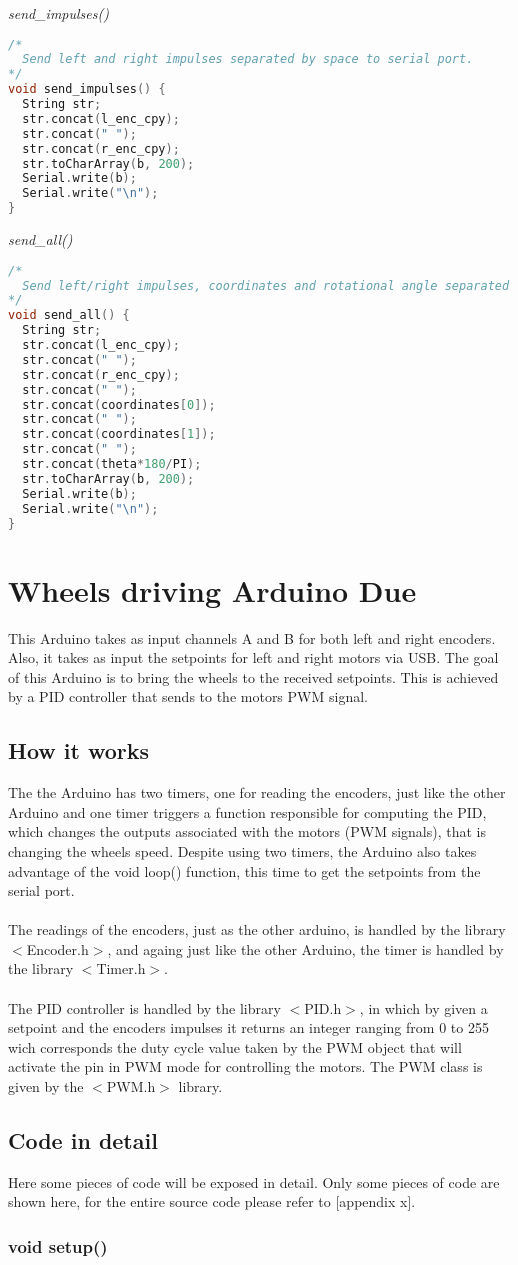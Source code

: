 \textit{send\_impulses()}

\begin{lstlisting}[language=C]
/* 
  Send left and right impulses separated by space to serial port. 
*/
void send_impulses() {
  String str;
  str.concat(l_enc_cpy);
  str.concat(" ");
  str.concat(r_enc_cpy);
  str.toCharArray(b, 200);
  Serial.write(b);
  Serial.write("\n");
}
\end{lstlisting}

\textit{send\_all()}

\begin{lstlisting}[language=C]
/* 
  Send left/right impulses, coordinates and rotational angle separated by space to serial port. 
*/
void send_all() {
  String str;
  str.concat(l_enc_cpy);
  str.concat(" ");
  str.concat(r_enc_cpy);
  str.concat(" ");
  str.concat(coordinates[0]);
  str.concat(" ");
  str.concat(coordinates[1]);
  str.concat(" ");
  str.concat(theta*180/PI);
  str.toCharArray(b, 200);
  Serial.write(b);
  Serial.write("\n");
}
\end{lstlisting}

\section{Wheels driving Arduino Due}
This Arduino takes as input channels A and B for both left and right encoders. Also, it takes as input the setpoints for left and right motors via USB. The goal of this Arduino 
is to bring the wheels to the received setpoints. This is achieved by a PID controller that sends to the motors PWM signal.

\subsection{How it works}
The the Arduino has two timers, one for reading the encoders, just like the other Arduino and one timer triggers a function responsible for computing the PID, which changes 
the outputs associated with the motors (PWM signals), that is changing the wheels speed. Despite using two timers, the Arduino also takes advantage of the void loop() function, this time to 
get the setpoints from the serial port.
\\ \\
The readings of the encoders, just as the other arduino, is handled by the library $<$Encoder.h$>$, and againg just like the other Arduino, the timer is handled by the library $<$Timer.h$>$.
\\ \\
The PID controller is handled by the library $<$PID.h$>$, in which by given a setpoint and the encoders impulses it returns an integer ranging from 0 to 255 wich corresponds the duty cycle value taken by the PWM object that will activate 
the pin in PWM mode for controlling the motors. The PWM class is given by the $<$PWM.h$>$ library.

\subsection{Code in detail}
Here some pieces of code will be exposed in detail. Only some pieces of code are shown here, for the entire source code please refer to [appendix x].

\subsubsection{void setup()}